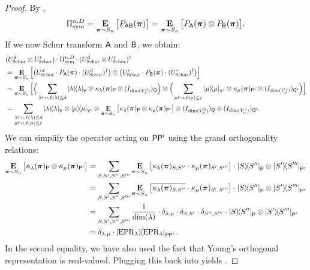 \begin{proof}
    By ,
    \begin{equation*}
        \Pi_{\mathrm{sym}}^{n, D} = \mathop{\bf E\/}_{\boldsymbol{\pi} \sim S_n} \big[P_{\mathsf{AB}}(\boldsymbol{\pi})\big] = \mathop{\bf E\/}_{\boldsymbol{\pi} \sim S_n}\big[ P_{\mathsf{A}}(\boldsymbol{\pi}) \otimes P_{\mathsf{B}}(\boldsymbol{\pi})\big].
    \end{equation*}
    If we now Schur transform $\mathsf{A}$ and $\mathsf{B}$, we obtain:
    \begin{align}
        & (U_{\mathrm{Schur}}^d \otimes U_{\mathrm{Schur}}^r) \cdot \Pi_{\mathrm{sym}}^{n, D} \cdot (U_{\mathrm{Schur}}^d \otimes U_{\mathrm{Schur}}^r)^\dagger  \nonumber \\
        & = \mathop{\bf E\/}_{\boldsymbol{\pi} \sim S_n} \Big[\big(U_{\mathrm{Schur}}^d \cdot P_{\mathsf{A}}(\boldsymbol{\pi}) \cdot (U_{\mathrm{Schur}}^d)^\dagger\big) \otimes \big(U_{\mathrm{Schur}}^r \cdot P_{\mathsf{B}}(\boldsymbol{\pi}) \cdot (U_{\mathrm{Schur}}^r)^\dagger\big) \Big] \nonumber \\
        & = \mathop{\bf E\/}_{\boldsymbol{\pi} \sim S_n} \Big[\Big(\sum_{\lambda \vdash n, \ell(\lambda) \leq d} \ketbra{\lambda}_{\mathsf{Y}} \otimes \kappa_\lambda(\boldsymbol{\pi})_{\mathsf{P}} \otimes (I_{\dim(V^d_\lambda)})_{\mathsf{Q}}\Big) \otimes \Big(\sum_{\mu \vdash n, \ell(\mu) \leq r} \ketbra{\mu}_{\mathsf{Y'}} \otimes \kappa_\mu(\boldsymbol{\pi})_{\mathsf{P'}} \otimes (I_{\dim(V^r_\mu)})_{\mathsf{Q'}}\Big)\Big] \nonumber \\
        & = \sum_{\substack{\lambda \vdash n, \ell(\lambda) \leq d \\ \mu \vdash n, \ell(\mu) \leq r}} \ketbra{\lambda}_{\mathsf{Y}} \otimes \ketbra{\mu}_{\mathsf{Y'}} \otimes \mathop{\bf E\/}_{\boldsymbol{\pi} \sim S_n} \big[\kappa_\lambda(\boldsymbol{\pi})_{\mathsf{P}} \otimes \kappa_\mu(\boldsymbol{\pi})_{\mathsf{P'}}\big] \otimes (I_{\dim(V^d_\lambda)})_{\mathsf{Q}} \otimes (I_{\dim(V^r_\mu)})_{\mathsf{Q'}}. \label{eq:averaging_1}
    \end{align}
    We can simplify the operator acting on $\mathsf{PP'}$ using the grand orthogonality relations:
    \begin{align*}
        \mathop{\bf E\/}_{\boldsymbol{\pi} \sim S_n} \big[\kappa_\lambda(\boldsymbol{\pi})_{\mathsf{P}} \otimes \kappa_\mu(\boldsymbol{\pi})_{\mathsf{P'}}\big] & = \sum_{S, S', S'', S'''} \mathop{\bf E\/}_{\boldsymbol{\pi} \sim S_n} \big[\kappa_\lambda(\boldsymbol{\pi})_{S,S''} \cdot \kappa_{\mu}(\boldsymbol{\pi})_{S',S'''}\big] \cdot \ketbra{S}{S''}_{\mathsf{P}} \otimes \ketbra{S'}{S'''}_{\mathsf{P'}} \\
        & = \sum_{S, S', S'', S'''} \mathop{\bf E\/}_{\boldsymbol{\pi} \sim S_n} \big[\overline{\kappa_\lambda(\boldsymbol{\pi})_{S,S''}} \cdot \kappa_{\mu}(\boldsymbol{\pi})_{S',S'''}\big] \cdot \ketbra{S}{S''}_{\mathsf{P}} \otimes \ketbra{S'}{S'''}_{\mathsf{P'}} \\
        & = \sum_{S, S', S'', S'''} \frac{1}{\dim(\lambda)} \cdot \delta_{\lambda, \mu} \cdot \delta_{S,S'} \cdot \delta_{S'',S'''} \cdot \ketbra{S}{S''}_{\mathsf{P}} \otimes \ketbra{S'}{S'''}_{\mathsf{P'}} \\
        & = \delta_{\lambda,\mu} \cdot \ketbra{\mathrm{EPR}_\lambda}_{\mathsf{PP'}}.
    \end{align*}
    In the second equality, we have also used the fact that Young's orthogonal representation is real-valued. Plugging this back into  yields .
\end{proof}

